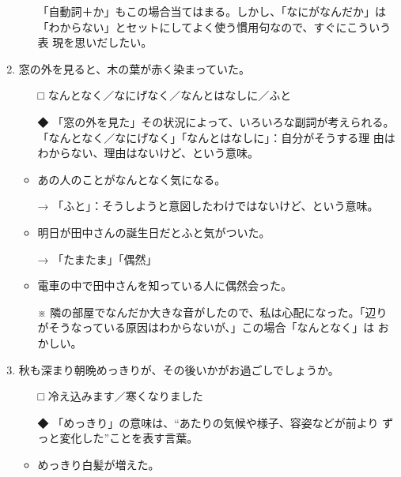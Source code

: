 \documentclass[
uplatex,
b5paper,
10pt,
dvipdfmx
]{jsbook}
\begin{document}
\begin{enumerate}
\begin{itemize}
      「自動詞＋か」もこの場合当てはまる。しかし、「なにがなんだか」は
      「わからない」とセットにしてよく使う慣用句なので、すぐにこういう表
      現を思いだしたい。
\end{itemize}

\item \underline{\hspace{3zw}}窓の外を見ると、木の葉が赤く染まっていた。

\begin{itemize}
\item[□] なんとなく／なにげなく／なんとはなしに／ふと
\item[◆] 「窓の外を見た」その状況によって、いろいろな副詞が考えられる。
     「なんとなく／なにげなく」「なんとはなしに」：自分がそうする理
    由はわからない、理由はないけど、という意味。
\end{itemize}

\begin{itemize}
\item あの人のことがなんとなく気になる。
\item[→] 「ふと」：そうしようと意図したわけではないけど、という意味。
\item 明日が田中さんの誕生日だとふと気がついた。
\item[→] 「たまたま」「偶然」
\item 電車の中で田中さんを知っている人に偶然会った。
\item[※] 隣の部屋でなんだか大きな音がしたので、私は心配になった。「辺り
	  がそうなっている原因はわからないが、」この場合「なんとなく」は
	  おかしい。
\end{itemize}

\item 秋も深まり朝晩めっきり\underline{\hspace{3zw}}が、その後いかがお過ごしでしょうか。

\begin{itemize}
\item[□] 冷え込みます／寒くなりました
\item[◆]「めっきり」の意味は、``あたりの気候や様子、容姿などが前より
	   ずっと変化した''ことを表す言葉。
\end{itemize}

\begin{itemize}
\item めっきり白髪が増えた。
\end{itemize}


\end{enumerate}
\end{document}
